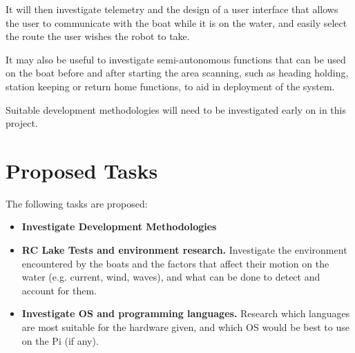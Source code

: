 \documentclass[titlepage 12pt]{article}
\begin{document}
{It will then investigate telemetry and the design of a user interface that allows the user to communicate with the boat while it is on the water, and easily select the route the user wishes the robot to take. 

It may also be useful to investigate semi-autonomous functions that can be used on the boat before and after starting the area scanning, such as heading holding, station keeping or return home functions, to aid in deployment of the system.
          
Suitable development methodologies will need to be investigated early on in this project.

\section{Proposed Tasks}
The following tasks are proposed:
\begin{itemize}
\item \textbf{Investigate Development Methodologies}

\item \textbf{RC Lake Tests and environment research.} Investigate the environment encountered by the boats and the factors that affect their motion on the water (e.g. current, wind, waves), and what can be done to detect and account for them.

\item \textbf{Investigate OS and programming languages.} Research which languages are most suitable for the hardware given, and which OS would be best to use on the Pi (if any). 


\end{itemize}}
\end{document}
